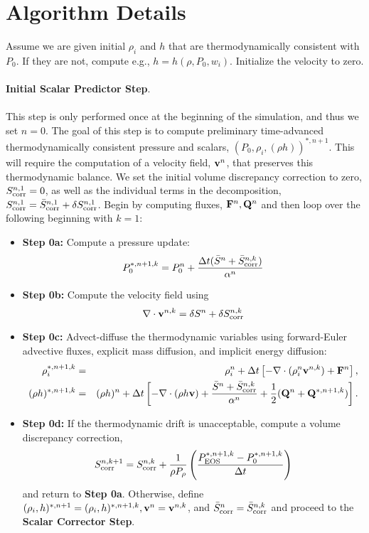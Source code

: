 \documentclass[final]{siamltex}
\def\Fb {{\bf F}}
\def\Qb {{\bf Q}}
\def\vb {{\bf v}}
\begin{document}
\section{Algorithm Details}
Assume we are given initial $\rho_i$ and $h$ that are thermodynamically consistent with 
$P_0$.  If they are not, compute e.g., $h = h(\rho,P_0,w_i)$.  Initialize the velocity
to zero.\\ \\
{\bf Initial Scalar Predictor Step}.\\ \\
This step is only performed once at the beginning of the simulation, and
thus we set $n=0$.
The goal of this step is to compute preliminary time-advanced thermodynamically
consistent pressure and scalars, $(P_0,\rho_i,(\rho h))^{*,n+1}$.  This will
require the computation of a velocity field, $\vb^n$, that preserves this
thermodynamic balance.  
We set the initial volume discrepancy correction to zero, 
$S_{\rm corr}^{n,1} = 0$, as well as the individual terms in the decomposition,
$S_{\rm corr}^{n,1} = \bar{S}_{\rm corr}^{n,1} + \delta S_{\rm corr}^{n,1}$.
Begin by computing fluxes, $\Fb^n, \Qb^n$ and then
loop over the following beginning with $k=1$:\\
\begin{itemize}
\item {\bf Step 0a:} Compute a pressure update:
\begin{equation}
P_0^{*,n+1,k} = P_0^n + \frac{\Delta t(\bar{S}^n + \bar{S}_{\rm corr}^{n,k})}{\alpha^n}
\end{equation}
\item {\bf Step 0b:} Compute the velocity field using
\begin{equation}
\nabla\cdot\vb^{n,k} = \delta S^n + \delta S_{\rm corr}^{n,k}
\end{equation}
\item {\bf Step 0c:} Advect-diffuse the thermodynamic variables using forward-Euler advective fluxes,
explicit mass diffusion, and implicit energy diffusion:
\begin{eqnarray}
\rho_i^{*,n+1,k} &=& \rho_i^n + \Delta t\left[-\nabla\cdot(\rho_i^n\vb^{n,k}) + \Fb^n\right], \\
(\rho h)^{*,n+1,k} &=& (\rho h)^n + \Delta t\left[-\nabla\cdot(\rho h\vb) + \frac{\bar{S}^n + \bar{S}_{\rm corr}^{n,k}}{\alpha^n} + \frac{1}{2}(\Qb^n + \Qb^{*,n+1,k})\right].\nonumber\\
\end{eqnarray}
\item {\bf Step 0d:} If the thermodynamic drift is unacceptable, compute a volume 
discrepancy correction,
\begin{equation}
S_{\rm corr}^{n,k+1} = S_{\rm corr}^{n,k} + \frac{1}{\rho P_\rho}\left(\frac{P_{\rm EOS}^{*,n+1,k} - P_0^{*,n+1,k}}{\Delta t}\right)
\end{equation}
and return to {\bf Step 0a}.  Otherwise, define 
$(\rho_i,h)^{*,n+1} = (\rho_i,h)^{*,n+1,k}, \vb^n = \vb^{n,k}$, and $\bar{S}_{\rm corr}^{n} = \bar{S}_{\rm corr}^{n,k}$ and proceed to 
the {\bf Scalar Corrector Step}.\\
\end{itemize}
\end{document}
